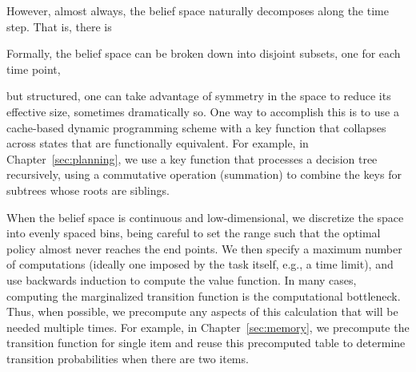However, almost always, the belief space naturally decomposes along the time step. That is, there is 

Formally, the belief space can be broken down into disjoint subsets, one for each time point,

but structured, one can take advantage of symmetry in the space to reduce its effective size, sometimes dramatically so. One way to accomplish this is to use a cache-based dynamic programming scheme with a key function that collapses across states that are functionally equivalent. For example, in Chapter~\ref{sec:planning}, we use a key function that processes a decision tree recursively, using a commutative operation (summation) to combine the keys for subtrees whose roots are siblings.

When the belief space is continuous and low-dimensional, we discretize the space into evenly spaced bins, being careful to set the range such that the optimal policy almost never reaches the end points. We then specify a maximum number of computations (ideally one imposed by the task itself, e.g., a time limit), and use backwards induction to compute the value function. In many cases, computing the marginalized transition function is the computational bottleneck. Thus, when possible, we precompute any aspects of this calculation that will be needed multiple times. For example, in Chapter~\ref{sec:memory}, we precompute the transition function for single item and reuse this precomputed table to determine transition probabilities when there are two items.


